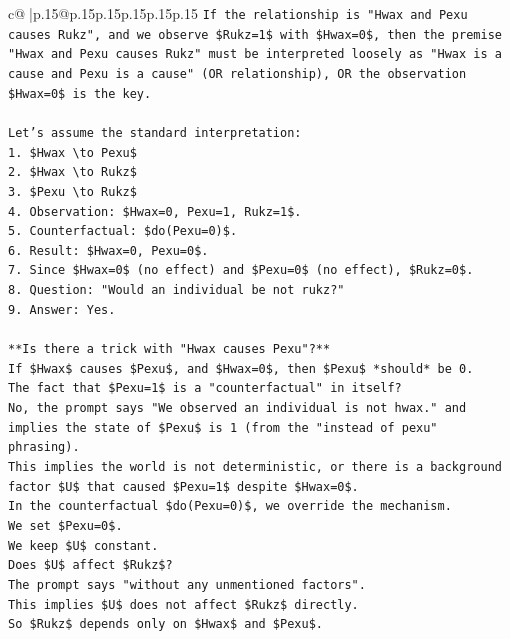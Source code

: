 \documentclass{article}
\begin{document}
{\begin{supertabular}{c@{$\;$}|p{.15\linewidth}@{}p{.15\linewidth}p{.15\linewidth}p{.15\linewidth}p{.15\linewidth}p{.15\linewidth}}
{{{\texttt{If the relationship is "Hwax and Pexu causes Rukz", and we observe \$Rukz=1\$ with \$Hwax=0\$, then the premise "Hwax and Pexu causes Rukz" must be interpreted loosely as "Hwax is a cause and Pexu is a cause" (OR relationship), OR the observation \$Hwax=0\$ is the key.} \\
\\ 
\texttt{Let's assume the standard interpretation:} \\
\texttt{1.  \$Hwax \textbackslash{}to Pexu\$} \\
\texttt{2.  \$Hwax \textbackslash{}to Rukz\$} \\
\texttt{3.  \$Pexu \textbackslash{}to Rukz\$} \\
\texttt{4.  Observation: \$Hwax=0, Pexu=1, Rukz=1\$.} \\
\texttt{5.  Counterfactual: \$do(Pexu=0)\$.} \\
\texttt{6.  Result: \$Hwax=0, Pexu=0\$.} \\
\texttt{7.  Since \$Hwax=0\$ (no effect) and \$Pexu=0\$ (no effect), \$Rukz=0\$.} \\
\texttt{8.  Question: "Would an individual be not rukz?"} \\
\texttt{9.  Answer: Yes.} \\
\\ 
\texttt{**Is there a trick with "Hwax causes Pexu"?**} \\
\texttt{If \$Hwax\$ causes \$Pexu\$, and \$Hwax=0\$, then \$Pexu\$ *should* be 0.} \\
\texttt{The fact that \$Pexu=1\$ is a "counterfactual" in itself?} \\
\texttt{No, the prompt says "We observed an individual is not hwax." and implies the state of \$Pexu\$ is 1 (from the "instead of pexu" phrasing).} \\
\texttt{This implies the world is not deterministic, or there is a background factor \$U\$ that caused \$Pexu=1\$ despite \$Hwax=0\$.} \\
\texttt{In the counterfactual \$do(Pexu=0)\$, we override the mechanism.} \\
\texttt{We set \$Pexu=0\$.} \\
\texttt{We keep \$U\$ constant.} \\
\texttt{Does \$U\$ affect \$Rukz\$?} \\
\texttt{The prompt says "without any unmentioned factors".} \\
\texttt{This implies \$U\$ does not affect \$Rukz\$ directly.} \\
\texttt{So \$Rukz\$ depends only on \$Hwax\$ and \$Pexu\$.} \\
}}}
\end{supertabular}}
\end{document}
